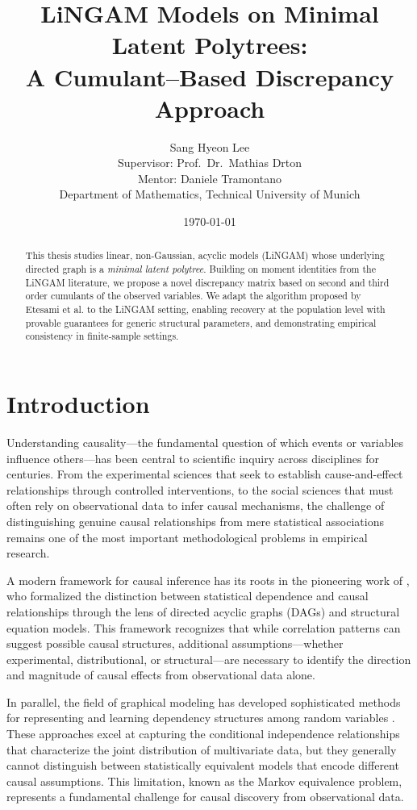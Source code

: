 \documentclass[11pt,a4paper]{article}
\title{LiNGAM Models on Minimal Latent Polytrees:\\A Cumulant--Based Discrepancy Approach}
\author{Sang Hyeon Lee\\
  \small Supervisor: Prof.~Dr.~Mathias Drton\\
  \small Mentor: Daniele Tramontano\\[1ex]
  \small Department of Mathematics, Technical University of Munich}
\date{\today}
\numberwithin{equation}{section}
\begin{document}
\maketitle

\begin{abstract}
This thesis studies linear, non-Gaussian, acyclic models (LiNGAM) whose underlying directed graph is a \emph{minimal latent polytree}. Building on moment identities from the LiNGAM literature, we propose a novel discrepancy matrix based on second and third order cumulants of the observed variables. We adapt the algorithm proposed by Etesami et al. to the LiNGAM setting, enabling recovery at the population level with provable guarantees for
generic structural parameters, and demonstrating empirical consistency in
finite-sample settings.
\end{abstract}

\tableofcontents

\section{Introduction}
\label{sec:intro}
Understanding causality—the fundamental question of which events or variables influence others—has been central to scientific inquiry across disciplines for centuries. From the experimental sciences that seek to establish cause-and-effect relationships through controlled interventions, to the social sciences that must often rely on observational data to infer causal mechanisms, the challenge of distinguishing genuine causal relationships from mere statistical associations remains one of the most important methodological problems in empirical research.

A modern framework for causal inference has its roots in the pioneering work of \citet{pearl:causality:2009}, who formalized the distinction between statistical dependence and causal relationships through the lens of directed acyclic graphs (DAGs) and structural equation models. This framework recognizes that while correlation patterns can suggest possible causal structures, additional assumptions—whether experimental, distributional, or structural—are necessary to identify the direction and magnitude of causal effects from observational data alone.

In parallel, the field of graphical modeling has developed sophisticated methods for representing and learning dependency structures among random variables \citep{lauritzen:graphical:1996, Edwards:intro:2000}. These approaches excel at capturing the conditional independence relationships that characterize the joint distribution of multivariate data, but they generally cannot distinguish between statistically equivalent models that encode different causal assumptions. This limitation, known as the Markov equivalence problem, represents a fundamental challenge for causal discovery from observational data.
\end{document}
